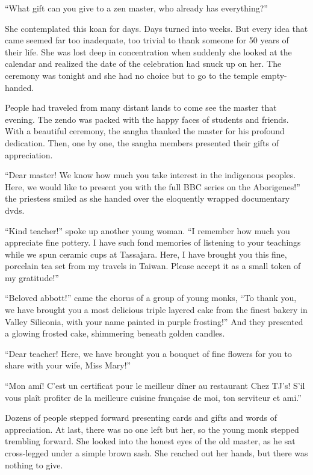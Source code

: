 “What gift can you give to a zen master, who already has everything?”

She contemplated this koan for days. Days turned into weeks. But every idea that came seemed far too inadequate, too trivial to thank someone for 50 years of their life. She was lost deep in concentration when suddenly she looked at the calendar and realized the date of the celebration had snuck up on her. The ceremony was tonight and she had no choice but to go to the temple empty-handed.

People had traveled from many distant lands to come see the master that evening. The zendo was packed with the happy faces of students and friends. With a beautiful ceremony, the sangha thanked the master for his profound dedication. Then, one by one, the sangha members presented their gifts of appreciation. 

“Dear master! We know how much you take interest in the indigenous peoples. Here, we would like to present you with the full BBC series on the Aborigenes!” the priestess smiled as she handed over the eloquently wrapped documentary dvds. 

“Kind teacher!” spoke up another young woman. “I remember how much you appreciate fine pottery. I have such fond memories of listening to your teachings while we spun ceramic cups at Tassajara. Here, I have brought you this fine, porcelain tea set from my travels in Taiwan. Please accept it as a small token of my gratitude!”

“Beloved abbott!” came the chorus of a group of young monks, “To thank you, we have brought you a most delicious triple layered cake from the finest bakery in Valley Siliconia, with your name painted in purple frosting!” And they presented a glowing frosted cake, shimmering beneath golden candles.

“Dear teacher! Here, we have brought you a bouquet of fine flowers for you to share with your wife, Miss Mary!”

“Mon amí! C’est un certificat pour le meilleur dîner au restaurant Chez TJ’s! S'il vous plaît profiter de la meilleure cuisine française de moi, ton serviteur et ami.”

Dozens of people stepped forward presenting cards and gifts and words of appreciation. At last, there was no one left but her, so the young monk stepped trembling forward. She looked into the honest eyes of the old master, as he sat cross-legged under a simple brown sash. She reached out her hands, but there was nothing to give. 

